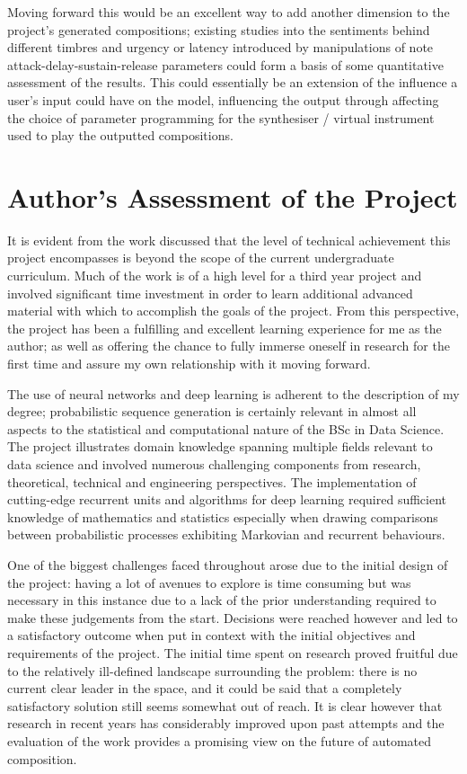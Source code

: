 \documentclass[12pt,]{article}
\begin{document}
Moving forward this would be an excellent way to add another dimension
to the project's generated compositions; existing studies into the
sentiments behind different timbres and urgency or latency introduced by
manipulations of note attack-delay-sustain-release parameters could form
a basis of some quantitative assessment of the results. This could
essentially be an extension of the influence a user's input could have
on the model, influencing the output through affecting the choice of
parameter programming for the synthesiser / virtual instrument used to
play the outputted compositions.

\hypertarget{authors-assessment-of-the-project}{%
\section{Author's Assessment of the
Project}\label{authors-assessment-of-the-project}}

It is evident from the work discussed that the level of technical
achievement this project encompasses is beyond the scope of the current
undergraduate curriculum. Much of the work is of a high level for a
third year project and involved significant time investment in order to
learn additional advanced material with which to accomplish the goals of
the project. From this perspective, the project has been a fulfilling
and excellent learning experience for me as the author; as well as
offering the chance to fully immerse oneself in research for the first
time and assure my own relationship with it moving forward.

The use of neural networks and deep learning is adherent to the
description of my degree; probabilistic sequence generation is certainly
relevant in almost all aspects to the statistical and computational
nature of the BSc in Data Science. The project illustrates domain
knowledge spanning multiple fields relevant to data science and involved
numerous challenging components from research, theoretical, technical
and engineering perspectives. The implementation of cutting-edge
recurrent units and algorithms for deep learning required sufficient
knowledge of mathematics and statistics especially when drawing
comparisons between probabilistic processes exhibiting Markovian and
recurrent behaviours.

One of the biggest challenges faced throughout arose due to the initial
design of the project: having a lot of avenues to explore is time
consuming but was necessary in this instance due to a lack of the prior
understanding required to make these judgements from the start.
Decisions were reached however and led to a satisfactory outcome when
put in context with the initial objectives and requirements of the
project. The initial time spent on research proved fruitful due to the
relatively ill-defined landscape surrounding the problem: there is no
current clear leader in the space, and it could be said that a
completely satisfactory solution still seems somewhat out of reach. It
is clear however that research in recent years has considerably improved
upon past attempts and the evaluation of the work provides a promising
view on the future of automated composition.
\end{document}
